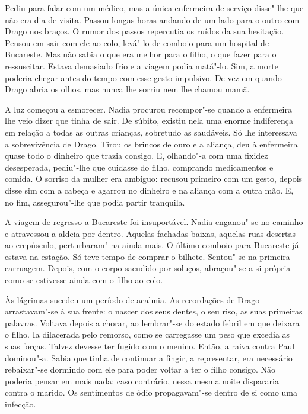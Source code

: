 Pediu para falar com um médico, mas a única enfermeira de serviço
disse"-lhe que não era dia de visita. Passou longas horas andando de um
lado para o outro com Drago nos braços. O rumor dos passos repercutia os
ruídos da sua hesitação. Pensou em sair com ele ao colo, levá"-lo de
comboio para um hospital de Bucareste. Mas não sabia o que era melhor
para o filho, o que fazer para o ressuscitar. Estava demasiado frio e a
viagem podia matá"-lo. Sim, a morte poderia chegar antes do tempo com
esse gesto impulsivo. De vez em quando Drago abria os olhos, mas nunca
lhe sorriu nem lhe chamou mamã.

A luz começou a esmorecer. Nadia procurou recompor"-se quando a enfermeira lhe veio dizer que tinha de sair. De súbito,
existiu nela uma enorme indiferença em relação a todas as outras
crianças, sobretudo as saudáveis. Só
lhe interessava a sobrevivência de Drago. Tirou os brincos de ouro e a
aliança, deu à enfermeira quase todo o dinheiro que trazia consigo. E,
olhando"-a com uma fixidez desesperada, pediu"-lhe que cuidasse do
filho, comprando medicamentos e comida. O sorriso da mulher era
ambíguo: recusou primeiro com um gesto, depois disse sim com a cabeça e
agarrou no dinheiro e na aliança com a outra mão. E, no fim,
assegurou"-lhe que podia partir tranquila.

A viagem de regresso a Bucareste foi insuportável. Nadia enganou"-se no
caminho e atravessou a aldeia por dentro. Aquelas fachadas baixas,
aquelas ruas desertas ao crepúsculo, perturbaram"-na ainda mais. O último
comboio para Bucareste já estava na estação. Só teve tempo de comprar
o bilhete. Sentou"-se na primeira carruagem. Depois, com o corpo sacudido
por soluços, abraçou"-se a si própria como se estivesse ainda com o filho
ao colo.

Às lágrimas sucedeu um período de acalmia. As recordações de Drago
arrastavam"-se à sua frente: o nascer dos seus dentes, o seu riso, as
suas primeiras palavras. Voltava depois a chorar, ao lembrar"-se do
estado febril em que deixara o filho. Ia dilacerada pelo remorso, como
se carregasse um peso que excedia as suas forças. Talvez devesse ter
fugido com o menino. Então, a raiva contra Paul dominou"-a. Sabia que
tinha de continuar a fingir, a representar, era necessário rebaixar"-se
dormindo com ele para poder voltar a ter o filho consigo. Não poderia
pensar em mais nada: caso contrário, nessa mesma noite dispararia contra
o marido. Os sentimentos de ódio propagavam"-se dentro de si como uma
infecção.

